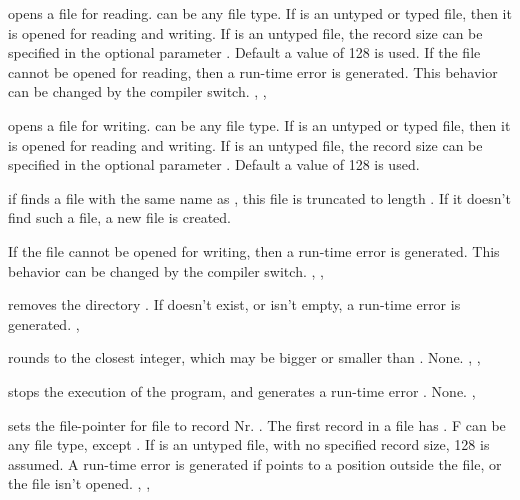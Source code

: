 \documentclass{report}
\begin{document}


{ opens a file  for reading.  can be any file type.
If  is an untyped or typed file, then it is opened for reading and 
writing. If  is an untyped file, the record size can be specified in 
the optional parameter . Default a value of 128 is used.}
{If the file cannot be opened for reading, then a run-time error is
generated. This behavior can be changed by the  compiler switch.}
{, , }




{ opens a file  for writing.  can be any file type.
If  is an untyped or typed file, then it is opened for reading and 
writing. If  is an untyped file, the record size can be specified in 
the optional parameter . Default a value of 128 is used.

if  finds a file with the same name as , this file is
truncated to length . If it doesn't find such a file, a new file is 
created.
}
{If the file cannot be opened for writing, then a run-time error is
generated. This behavior can be changed by the  compiler switch.}
{, , }




{ removes the  directory .}
{If  doesn't exist, or isn't empty, a run-time error is generated.
}
{, }



{ rounds  to the closest integer, which may be bigger or
smaller than .}
{None.}
{, , }



{ stops the execution of the program, and generates a
run-time error .}
{None.}
{, }



{ sets the file-pointer for file  to record Nr. .
The first record in a file has . F can be any file type, except
. If  is an untyped file, with no specified record size, 128
is assumed.}
{A run-time error is generated if  points to a position outside
the file, or the file isn't opened.}
{, , }
\end{document}
